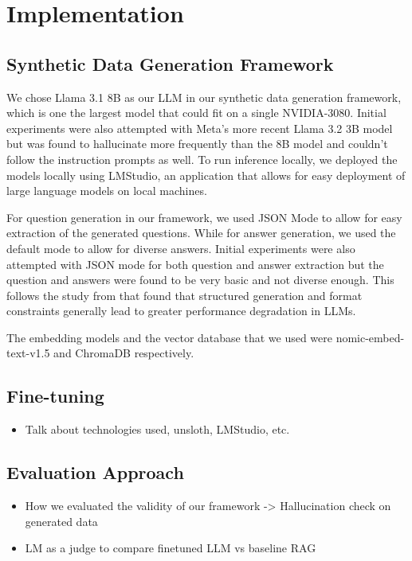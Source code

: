 \section{Implementation}


\subsection{Synthetic Data Generation Framework}

We chose Llama 3.1 8B as our LLM in our synthetic data generation framework, which is one the largest model that could fit on a single NVIDIA-3080. Initial experiments 
were also attempted with Meta's more recent Llama 3.2 3B model but was found to hallucinate more frequently than the 8B model and couldn't follow the instruction prompts as well.
To run inference locally, we deployed the models locally using LMStudio, an application that allows for easy deployment of large language models on local machines. 

For question generation in our framework, we used JSON Mode to allow for easy extraction of the generated questions. While for answer generation, we used the default 
mode to allow for diverse answers. Initial experiments were also attempted with JSON mode for both question and answer extraction but the question and answers
were found to be very basic and not diverse enough. This follows the study from \cite{tam2024letspeakfreelystudy} that found that structured generation and format constraints 
generally lead to greater performance degradation in LLMs.

The embedding models and the vector database that we used were nomic-embed-text-v1.5 and ChromaDB respectively.

\subsection{Fine-tuning}

\begin{itemize}
    \item Talk about technologies used, unsloth, LMStudio, etc. 
\end{itemize}

\subsection{Evaluation Approach}
\begin{itemize}
\item How we evaluated the validity of our framework -> Hallucination check on generated data 
\item LM as a judge to compare finetuned LLM vs baseline RAG
\end{itemize}

